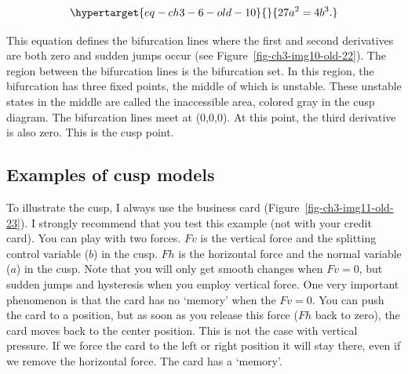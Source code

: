 \documentclass[
  a4paper,
  DIV=11,
  numbers=noendperiod]{scrreprt}
\begin{document}
\begin{equation}\protect\hypertarget{eq-ch3-6-old-10}{}{
27a^{2} = 4b^{3}.
}\label{eq-ch3-6-old-10}\end{equation}

This equation defines the bifurcation lines where the first and second
derivatives are both zero and sudden jumps occur (see
Figure~\ref{fig-ch3-img10-old-22}). The region between the bifurcation
lines is the bifurcation set. In this region, the bifurcation has three
fixed points, the middle of which is unstable. These unstable states in
the middle are called the inaccessible area, colored gray in the cusp
diagram. The bifurcation lines meet at (0,0,0). At this point, the third
derivative is also zero. This is the cusp point.

\hypertarget{sec-Examples-of-cusp-models}{%
\subsection{Examples of cusp models}\label{sec-Examples-of-cusp-models}}

To illustrate the cusp, I always use the business card
(Figure~\ref{fig-ch3-img11-old-23}). I strongly recommend that you test
this example (not with your credit card). You can play with two forces.
\(Fv\) is the vertical force and the splitting control variable (\(b\))
in the cusp. \(Fh\) is the horizontal force and the normal variable
(\(a\)) in the cusp. Note that you will only get smooth changes when
\(Fv = 0\), but sudden jumps and hysteresis when you employ vertical
force. One very important phenomenon is that the card has no `memory'
when the \(Fv = 0\). You can push the card to a position, but as soon as
you release this force (\(Fh\) back to zero), the card moves back to the
center position. This is not the case with vertical pressure. If we
force the card to the left or right position it will stay there, even if
we remove the horizontal force. The card has a `memory'.
\end{document}
